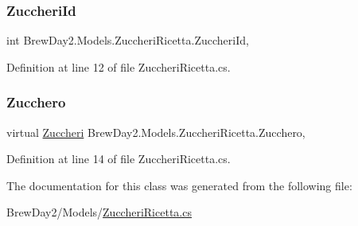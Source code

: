 \mbox{\label{class_brew_day2_1_1_models_1_1_zuccheri_ricetta_a4a18160de16932d79fe8d6405d69564c}} 
\subsubsection{\texorpdfstring{Zuccheri\+Id}{ZuccheriId}}
{\footnotesize\ttfamily int Brew\+Day2.\+Models.\+Zuccheri\+Ricetta.\+Zuccheri\+Id\hspace{0.3cm}{\ttfamily [get]}, {\ttfamily [set]}}



Definition at line 12 of file Zuccheri\+Ricetta.\+cs.

\mbox{\label{class_brew_day2_1_1_models_1_1_zuccheri_ricetta_abbb04536ee8b95032c945920da5c67e7}} 
\subsubsection{\texorpdfstring{Zucchero}{Zucchero}}
{\footnotesize\ttfamily virtual \mbox{\hyperlink{class_brew_day2_1_1_models_1_1_zuccheri}{Zuccheri}} Brew\+Day2.\+Models.\+Zuccheri\+Ricetta.\+Zucchero\hspace{0.3cm}{\ttfamily [get]}, {\ttfamily [set]}}



Definition at line 14 of file Zuccheri\+Ricetta.\+cs.



The documentation for this class was generated from the following file\+:\begin{DoxyCompactItemize}
\item 
Brew\+Day2/\+Models/\mbox{\hyperlink{_zuccheri_ricetta_8cs}{Zuccheri\+Ricetta.\+cs}}\end{DoxyCompactItemize}
